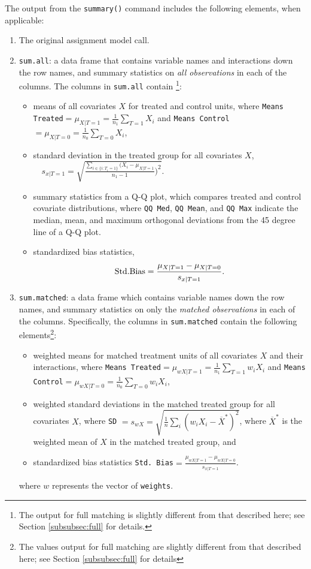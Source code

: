 The output from the \texttt{summary()} command includes the following
elements, when applicable:
\begin{enumerate}
\item The original assignment model call.
\item \texttt{sum.all}: a data frame that contains variable names
  and interactions down the row names, and summary statistics on
  \emph{all observations} in each of the columns.  The columns in
  \texttt{sum.all} contain \footnote{The output for full matching is
    slightly different from that described here; see Section
    \ref{subsubsec:full} for details.}:
  \begin{itemize}
  \item means of all covariates $X$ for treated and control units,
    where \texttt{Means Treated}$= \mu_{X|T=1} = \frac{1}{n_1}
    \sum_{T=1} X_i$ and \texttt{Means Control}$= \mu_{X|T=0} =
    \frac{1}{n_0} \sum_{T=0} X_i$,
  \item standard deviation in the treated group for all covariates $X$,  
        $\quad s_{x|T=1} = \sqrt{\frac{\sum_{i \in \{i: T_i=1\}}
        (X_i - \mu_{X|T=1}}{n_1-1})^2 }.$
  \item summary statistics from a Q-Q plot, which compares treated and
    control covariate distributions, where \texttt{QQ Med}, \texttt{QQ
      Mean}, and \texttt{QQ Max} indicate the median, mean, and
    maximum orthogonal deviations from the 45 degree line of a Q-Q
    plot.
  \item standardized bias statistics, $${\rm Std.
      Bias}=\frac{\mu_{X|T=1} - \mu_{X|T=0}}{s_{x|T=1}}.$$
  \end{itemize}
  
\item \texttt{sum.matched}: a data frame which contains variable
  names down the row names, and summary statistics on only the
  \emph{matched observations} in each of the columns.  Specifically,
  the columns in \texttt{sum.matched} contain the following
  elements\footnote{The values output for full matching are slightly
    different from that described here; see Section \ref{subsubsec:full}
    for details}:
  \begin{itemize}
  \item weighted means for matched treatment units of all covariates
    $X$ and their interactions, where \texttt{Means Treated}$=
    \mu_{wX|T=1} = \frac{1}{n_1} \sum_{T=1} w_iX_i$ and \texttt{Means
      Control}$=\mu_{wX|T=0} = \frac{1}{n_0} \sum_{T=0} w_iX_i$,
  \item weighted standard deviations in the matched treated group 
   for all covariates $X$, where \texttt{SD} $= 
    s_{wX} =
    \sqrt{\frac{1}{n} \sum_{i} (w_iX_i - \overline{X}^*)^2}$, where
    $\overline{X}^*$ is the weighted mean of $X$ in the matched treated group, and
  \item standardized bias statistics \texttt{Std.
      Bias}$=\frac{\mu_{wX|T=1} - \mu_{wX|T=0}}{s_{x|T=1}}$.
  \end{itemize}
  where $w$ represents the vector of \texttt{weights}.
  

\end{enumerate}
